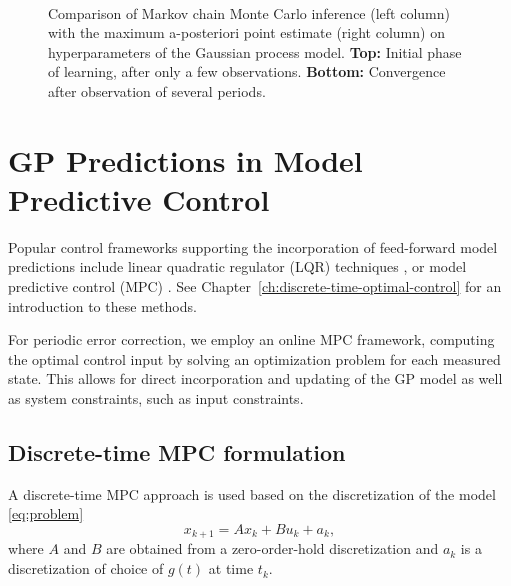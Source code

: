 \begin{figure*}
\setlength{\figurewidth}{0.45\columnwidth}%
\setlength{\figureheight}{0.25\columnwidth}%
\centering%
\footnotesize%
%
\\%
%
%
\caption[Comparison of MCMC inference to MAP inference.]{Comparison of Markov
chain Monte Carlo inference (left column) with the maximum a-posteriori point
estimate (right column) on hyperparameters of the Gaussian process model.
{\bfseries Top:} Initial phase of learning, after only a few observations.
{\bfseries Bottom:} Convergence after observation of several periods.}
\label{fig:ml_vs_sampling}
\end{figure*}

\section{GP Predictions in Model Predictive Control}
\label{sec:control}
Popular control frameworks supporting the incorporation of feed-forward model
predictions include linear quadratic regulator (LQR)
\clearpage \noindent
techniques \cite[]{Ogata:1995:Discrete}, or model predictive control (MPC)
\cite{Rawlings.Mayne:2009:Model}. See
Chapter~\ref{ch:discrete-time-optimal-control} for an introduction to these
methods.

For periodic error correction, we employ an online MPC framework, computing
the optimal control input by solving an optimization problem for each measured
state. This allows for direct incorporation and updating of the GP model
as well as system constraints, such as input constraints.

\subsection{Discrete-time MPC formulation}
\label{sec:standard_mpc}

A discrete-time MPC approach is used based on the discretization of the model
\eqref{eq:problem}
\begin{equation}
  \label{eq:pec-discrete-system}
  x_{k+1} = A x_k + B u_k + a_k,
\end{equation}
where $A$ and $B$ are obtained from a zero-order-hold discretization and
$a_k$ is a discretization of choice of $g(t)$ at time $t_k$.

